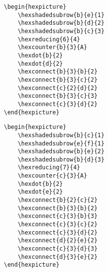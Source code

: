 \documentclass[a4paper,12pt]{article}
\begin{document}
    \begin{hexpicture}
    \end{hexpicture}
    
    \begin{verbatim}\begin{hexpicture}
    \hexshadedsubrow{b}{e}{1}
    \hexshadedsubrow{b}{d}{2}
    \hexshadedsubrow{b}{c}{3}
    \hexreducing{6}{4}
    \hexcounter{b}{3}{A}
    \hexdot{b}{2}
    \hexdot{d}{2}
    \hexconnect{b}{3}{b}{2}
    \hexconnect{b}{3}{c}{2}
    \hexconnect{c}{2}{d}{2}
    \hexconnect{b}{3}{c}{3}
    \hexconnect{c}{3}{d}{2}
\end{hexpicture}\end{verbatim}
    
    \begin{hexpicture}
    \end{hexpicture}


    \begin{verbatim}\begin{hexpicture}
    \hexshadedsubrow{b}{c}{1}
    \hexshadedsubrow{e}{f}{1}
    \hexshadedsubrow{b}{e}{2}
    \hexshadedsubrow{b}{d}{3}
    \hexreducing{7}{4}
    \hexcounter{c}{3}{A}
    \hexdot{b}{2}
    \hexdot{e}{2}
    \hexconnect{b}{2}{c}{2}
    \hexconnect{b}{3}{b}{2}
    \hexconnect{c}{3}{b}{3}
    \hexconnect{c}{3}{c}{2}
    \hexconnect{c}{3}{d}{2}
    \hexconnect{d}{2}{e}{2}
    \hexconnect{c}{3}{d}{3}
    \hexconnect{d}{3}{e}{2}
\end{hexpicture}\end{verbatim}

	\begin{hexpicture}
    \end{hexpicture}
\end{document}
